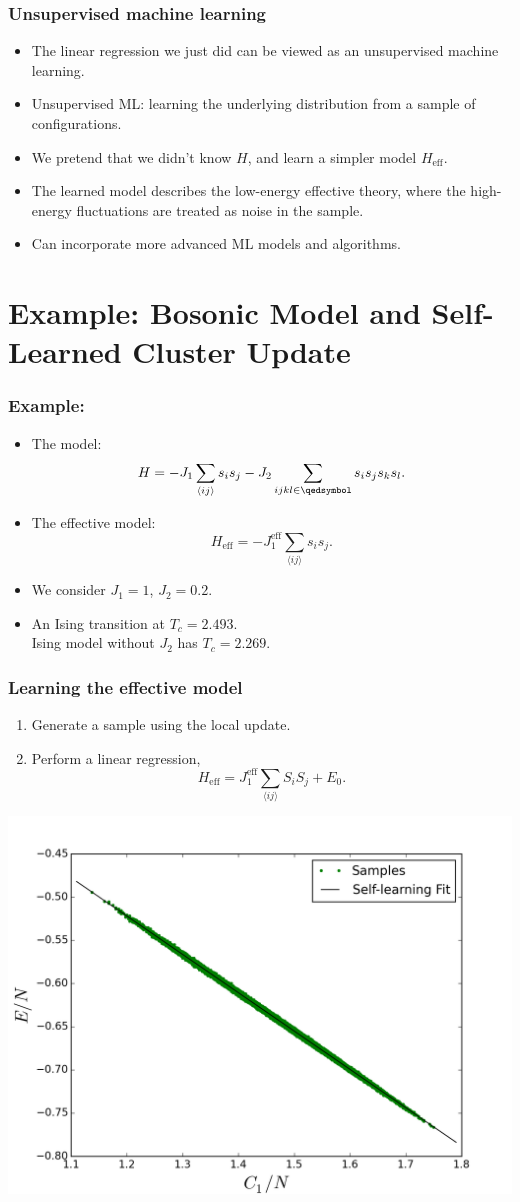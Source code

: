 \documentclass[xcolor=table, 10pt, aspectratio=169]{beamer}
\begin{document}
\begin{frame}
  \frametitle{Unsupervised machine learning}
  \begin{itemize}
    \item The linear regression we just did can be viewed as an unsupervised machine learning.
    \item Unsupervised ML: learning the underlying distribution from a sample of configurations.
    \item We pretend that we didn't know $H$, and learn a simpler model $H_{\text{eff}}$.
    \item The learned model describes the low-energy effective theory, where the high-energy fluctuations are treated as noise in the sample.
    \item Can incorporate more advanced ML models and algorithms.
  \end{itemize}
\end{frame}


\section{Example: Bosonic Model and Self-Learned Cluster Update}

\begin{frame}
  \frametitle{Example:}
  \begin{itemize}
    \item The model:
    \[H= - J_1 \sum_{\langle ij\rangle} s_i s_j - J_2 \sum_{ijkl \in \qedsymbol } s_i s_j s_k s_l.\]
    \item The effective model:
    \[H_{\text{eff}} = -J_1^{\text{eff}}\sum_{\langle ij\rangle} s_i s_j.\]
    \item We consider $J_1=1$, $J_2=0.2$.
    \item An Ising transition at $T_c=2.493$.\\
    {\small Ising model without $J_2$ has $T_c=2.269$.}
  \end{itemize}
\end{frame}

\begin{frame}
  \frametitle{Learning the effective model}
    \begin{enumerate}
      \item Generate a sample using the local update.
      \item Perform a linear regression,
      \[  H_{\text{eff}} = J_1^{\text{eff}}\sum_{\langle ij\rangle}S_iS_j+E_0.\]
    \end{enumerate}
    \centering
    \includegraphics[width=.5\columnwidth]{dist_fit.png}
\end{frame}
\end{document}

